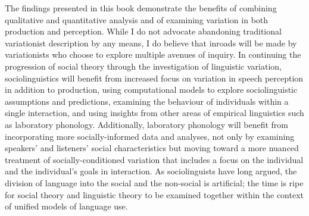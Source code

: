 The findings presented in this book demonstrate the benefits of combining qualitative and quantitative analysis and of examining variation in both production and perception.  While I do not advocate abandoning traditional variationist description by any means, I do believe that inroads will be made by variationists who choose to explore multiple avenues of inquiry.  In continuing the progression of social theory through the investigation of linguistic variation, sociolinguistics will benefit from increased focus on variation in speech perception in addition to production, using computational models to explore sociolinguistic assumptions and predictions, examining the behaviour of individuals within a single interaction, and using insights from other areas of empirical linguistics such as laboratory phonology.  Additionally, laboratory phonology will benefit from incorporating more socially-informed data and analyses, not only by examining speakers' and listeners' social characteristics but moving toward a more nuanced treatment of socially-conditioned variation that includes a focus on the individual and the individual's goals in interaction. As sociolinguists have long argued, the division of language into the social and the non-social is artificial; the time is ripe for social theory and linguistic theory to be examined together within the context of unified models of language use.